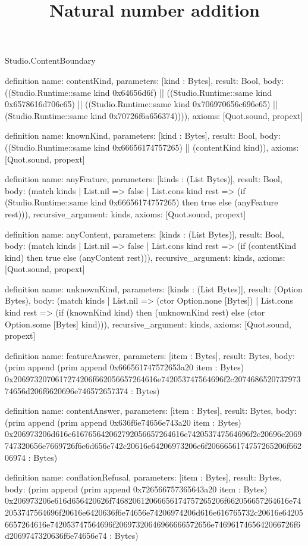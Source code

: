 \begin{lexlean}{Studio.ContentBoundary}
\title{Natural number addition}
\begin{semanticmodule}
definition{
  name: contentKind,
  parameters: [kind : Bytes],
  result: Bool,
  body: ((Studio.Runtime::same kind 0x64656d6f) || ((Studio.Runtime::same kind 0x6578616d706c65) || ((Studio.Runtime::same kind 0x706970656c696e65) || (Studio.Runtime::same kind 0x70726f6a656374)))),
  axioms: [Quot.sound, propext]
}

definition{
  name: knownKind,
  parameters: [kind : Bytes],
  result: Bool,
  body: ((Studio.Runtime::same kind 0x66656174757265) || (contentKind kind)),
  axioms: [Quot.sound, propext]
}

definition{
  name: anyFeature,
  parameters: [kinds : (List Bytes)],
  result: Bool,
  body: (match kinds
    | List.nil => false
    | List.cons kind rest => (if (Studio.Runtime::same kind 0x66656174757265) then true else (anyFeature rest))),
  recursive_argument: kinds,
  axioms: [Quot.sound, propext]
}

definition{
  name: anyContent,
  parameters: [kinds : (List Bytes)],
  result: Bool,
  body: (match kinds
    | List.nil => false
    | List.cons kind rest => (if (contentKind kind) then true else (anyContent rest))),
  recursive_argument: kinds,
  axioms: [Quot.sound, propext]
}

definition{
  name: unknownKind,
  parameters: [kinds : (List Bytes)],
  result: (Option Bytes),
  body: (match kinds
    | List.nil => (ctor Option.none [Bytes])
    | List.cons kind rest => (if (knownKind kind) then (unknownKind rest) else (ctor Option.some [Bytes] kind))),
  recursive_argument: kinds,
  axioms: [Quot.sound, propext]
}

definition{
  name: featureAnswer,
  parameters: [item : Bytes],
  result: Bytes,
  body: (prim append (prim append 0x666561747572653a20 item : Bytes) 0x2069732070617274206f662056657264616e742053747564696f2c207468652073797374656d206f6620696e746572657374 : Bytes)
}

definition{
  name: contentAnswer,
  parameters: [item : Bytes],
  result: Bytes,
  body: (prim append (prim append 0x636f6e74656e743a20 item : Bytes) 0x206973206d616e616765642062792056657264616e742053747564696f2c20696e2069747320656e7669726f6e6d656e742c20616e64206973206e6f2066656174757265206f66206974 : Bytes)
}

definition{
  name: conflationRefusal,
  parameters: [item : Bytes],
  result: Bytes,
  body: (prim append (prim append 0x726566757365643a20 item : Bytes) 0x206973206e616d656420626f746820612066656174757265206f662056657264616e742053747564696f20616e6420636f6e74656e74206974206d616e616765732c20616e642056657264616e742053747564696f20697320646966666572656e7469617465642066726f6d2069747320636f6e74656e74 : Bytes)
}


\end{semanticmodule}
\end{lexlean}
